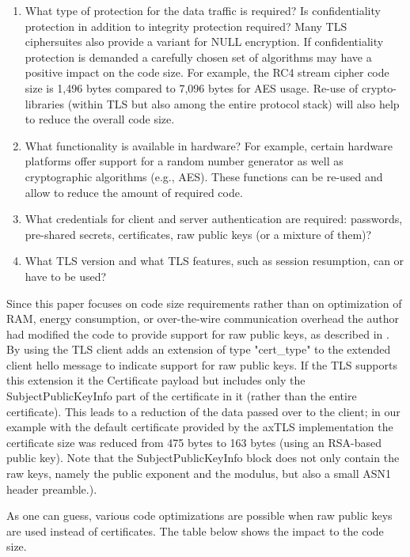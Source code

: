 \documentclass[a4paper, 10pt]{IEEEtran}
\begin{document}
\begin{enumerate}
\item What type of protection for the data traffic is required? Is confidentiality protection in addition to integrity protection required? Many TLS ciphersuites also provide a variant for NULL encryption. If confidentiality protection is demanded a carefully chosen set of algorithms may have a positive impact on the code size. For example, the RC4 stream cipher code size is 1,496 bytes compared to 7,096 bytes for AES usage. Re-use of crypto-libraries (within TLS but also among the entire protocol stack) will also help to reduce the overall code size. 
\item What functionality is available in hardware? For example, certain hardware platforms offer support for a random number generator as well as cryptographic algorithms (e.g., AES). These functions can be re-used and allow to reduce the amount of required code. 
\item What credentials for client and server authentication are required: passwords, pre-shared secrets, certificates, raw public keys (or a mixture of them)? 
\item What TLS version and what TLS features, such as session resumption, can or have to be used?
\end{enumerate} 

Since this paper focuses on code size requirements rather than on optimization of RAM, energy consumption, or over-the-wire communication overhead the author had modified the code to provide support for raw public keys, as described in \cite{I-d.ietf-tls-oob-pubkey}. By using \cite{I-d.ietf-tls-oob-pubkey} the TLS client adds an extension of type "cert\_type" to the extended client hello message to indicate support for raw public keys. If the TLS supports this extension it the Certificate payload but includes only the SubjectPublicKeyInfo part of the certificate in it (rather than the entire certificate). This leads to a reduction of the data passed over to the client; in our example with the default certificate provided by the axTLS implementation the certificate size was reduced from 475 bytes to 163 bytes (using an RSA-based public key). Note that the SubjectPublicKeyInfo block does not only contain the raw keys, namely the public exponent and the modulus, but also a small ASN1 header preamble.).  

As one can guess, various code optimizations are possible when raw public keys are used instead of certificates. The table below shows the impact to the code size. 
\end{document}
